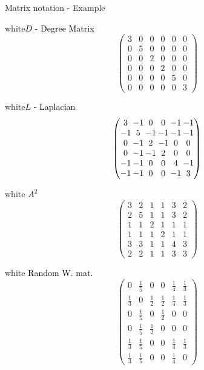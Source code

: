 \documentclass[a4paper,11pt]{book}
\begin{document}
\begin{textbox}{Matrix notation - Example}
\begin{multibox}{2}
\begin{subbox}{white}{\textcolor{black}{$D$ - Degree Matrix}}
\centering
\footnotesize
\[\begin{pmatrix}
  3  &  0  &  0  &  0  &  0  &  0 \\
  0  &  5  &  0  &  0  &  0  &  0 \\
  0  &  0  &  2  &  0  &  0  &  0 \\
  0  &  0  &  0  &  2  &  0  &  0 \\
  0  &  0  &  0  &  0  &  5  &  0 \\
  0  &  0  &  0  &  0  &  0  &  3 
\end{pmatrix}
\]
\end{subbox}
\begin{subbox}{white}{\textcolor{black}{$L$ - Laplacian }}
\centering
\footnotesize
\[
\setlength\arraycolsep{1pt}
\begin{pmatrix}
  3  & -1  &  0  &  0  & -1  & -1 \\
 -1  &  5  & -1  & -1  & -1  & -1 \\
  0  & -1  &  2  & -1  &  0  &  0 \\
  0  & -1  & -1  &  2  &  0  &  0 \\
 -1  & -1  &  0  &  0  &  4  & -1 \\
 -1  & -1  &  0  &  0  & -1  &  3 
\end{pmatrix}
\]
\end{subbox}
\begin{subbox}{white}{\textcolor{black}{ $A^2$}}
\centering
\footnotesize
\[\begin{pmatrix}
  3  &  2  &  1  &  1  &  3  &  2 \\
  2  &  5  &  1  &  1  &  3  &  2 \\
  1  &  1  &  2  &  1  &  1  &  1 \\
  1  &  1  &  1  &  2  &  1  &  1 \\
  3  &  3  &  1  &  1  &  4  &  3 \\
  2  &  2  &  1  &  1  &  3  &  3 
\end{pmatrix}
\]
\end{subbox}
\begin{subbox}{white}{\textcolor{black}{ Random W. mat.}}
\centering
\footnotesize
\setlength\arraycolsep{3pt}
\[\begin{pmatrix}
  0 &  \frac{1}{5} &  0 &  0 &  \frac{1}{4} &  \frac{1}{3}\\[6pt]
  \frac{1}{3} &  0 &  \frac{1}{2} &  \frac{1}{2} &  \frac{1}{4} &  \frac{1}{3}\\[6pt]
  0 &  \frac{1}{5} &  0 &  \frac{1}{2} &  0 &  0\\[6pt]
  0 &  \frac{1}{5} &  \frac{1}{2} &  0 &  0 &  0\\[6pt]
  \frac{1}{3} & \frac{1}{5} &  0 &  0 &  \frac{1}{4} &  \frac{1}{3}\\[6pt]
  \frac{1}{3} &  \frac{1}{5} &  0 &  0 &  \frac{1}{4} &  0
 \end{pmatrix}
\]
\end{subbox}



\end{multibox}
\end{textbox}
\end{document}

